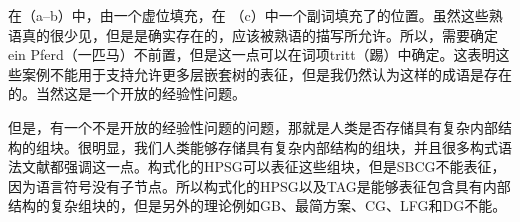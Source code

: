 \zl
在（a--b）中，\vfc 由一个虚位填充，在 （c）中一个副词填充了\vfc 的位置。虽然这些熟语真的很少见，但是是确实存在的，应该被熟语的描写所允许。所以，需要确定ein Pferd（一匹马）不前置，但是这一点可以在词项tritt（踢）中确定。这表明这些案例不能用于支持允许更多层嵌套树的表征，但是我仍然认为这样的成语是存在的。当然这是一个开放的经验性问题。

但是，有一个不是开放的经验性问题的问题，那就是人类是否存储具有复杂内部结构的组块。很明显，我们人类能够存储具有复杂内部结构的组块，并且很多构式语法文献都强调这一点。构式化的HPSG可以表征这些组块，但是SBCG不能表征，因为语言符号没有子节点。所以构式化的HPSG以及TAG是能够表征包含具有内部结构的复杂组块的，但是另外的理论例如GB、最简方案、CG、LFG和DG不能。



  
